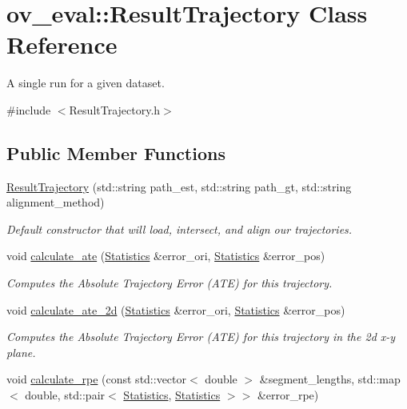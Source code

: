 \hypertarget{classov__eval_1_1ResultTrajectory}{}\section{ov\+\_\+eval\+:\+:Result\+Trajectory Class Reference}
\label{classov__eval_1_1ResultTrajectory}


A single run for a given dataset.  




{\ttfamily \#include $<$Result\+Trajectory.\+h$>$}

\subsection*{Public Member Functions}
\begin{DoxyCompactItemize}
\item 
\hyperlink{classov__eval_1_1ResultTrajectory_a91d8d079db9f290d384746b7a030e336}{Result\+Trajectory} (std\+::string path\+\_\+est, std\+::string path\+\_\+gt, std\+::string alignment\+\_\+method)
\begin{DoxyCompactList}\small\item\em Default constructor that will load, intersect, and align our trajectories. \end{DoxyCompactList}\item 
void \hyperlink{classov__eval_1_1ResultTrajectory_aa82df799f7eb6ccc6f7665cd7a383c40}{calculate\+\_\+ate} (\hyperlink{structov__eval_1_1Statistics}{Statistics} \&error\+\_\+ori, \hyperlink{structov__eval_1_1Statistics}{Statistics} \&error\+\_\+pos)
\begin{DoxyCompactList}\small\item\em Computes the Absolute Trajectory Error (A\+TE) for this trajectory. \end{DoxyCompactList}\item 
void \hyperlink{classov__eval_1_1ResultTrajectory_aea298386d6615b31a75e9578baf77497}{calculate\+\_\+ate\+\_\+2d} (\hyperlink{structov__eval_1_1Statistics}{Statistics} \&error\+\_\+ori, \hyperlink{structov__eval_1_1Statistics}{Statistics} \&error\+\_\+pos)
\begin{DoxyCompactList}\small\item\em Computes the Absolute Trajectory Error (A\+TE) for this trajectory in the 2d x-\/y plane. \end{DoxyCompactList}\item 
void \hyperlink{classov__eval_1_1ResultTrajectory_abf4d8b00abdf68692ceaa85b5c1c5b0f}{calculate\+\_\+rpe} (const std\+::vector$<$ double $>$ \&segment\+\_\+lengths, std\+::map$<$ double, std\+::pair$<$ \hyperlink{structov__eval_1_1Statistics}{Statistics}, \hyperlink{structov__eval_1_1Statistics}{Statistics} $>$$>$ \&error\+\_\+rpe)
$$
\end{DoxyCompactItemize}
